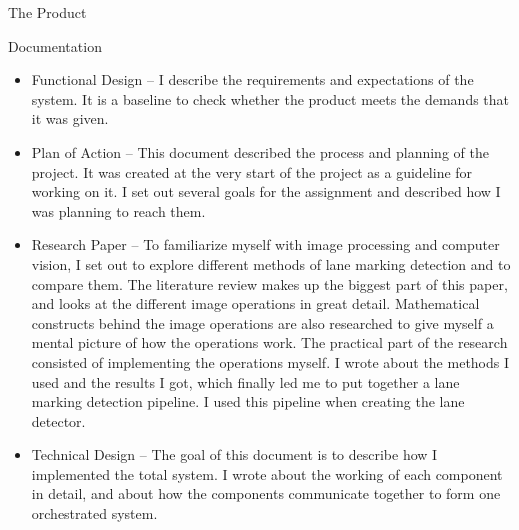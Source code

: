 \documentclass{matthijs}
\begin{document}
\begin{hoofdstuk}{The Product}
\begin{paragraaf}{Documentation}
\begin{itemize}
				\item Functional Design --
					I describe the requirements and expectations of the system.
					It is a baseline to check whether the product meets the demands that it was given.

				\item Plan of Action --
					This document described the process and planning of the project.
					It was created at the very start of the project as a guideline for working on it.
					I set out several goals for the assignment and described how I was planning to reach them.

				\item Research Paper --
					To familiarize myself with image processing and computer vision, I set out to explore different methods of lane marking detection and to compare them.
					The literature review makes up the biggest part of this paper, and looks at the different image operations in great detail.
					Mathematical constructs behind the image operations are also researched to give myself a mental picture of how the operations work.
					The practical part of the research consisted of implementing the operations myself.
					I wrote about the methods I used and the results I got, which finally led me to put together a lane marking detection pipeline.
					I used this pipeline when creating the lane detector.

				\item Technical Design --
					The goal of this document is to describe how I implemented the total system.
					I wrote about the working of each component in detail, and about how the components communicate together to form one orchestrated system.

			\end{itemize}

		\end{paragraaf}

	\end{hoofdstuk}
	
\end{document}
